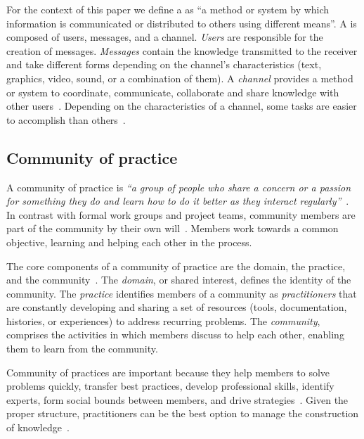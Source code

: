     For the context of this paper we define a \channel as {``a method or system by which information is communicated or distributed to others using different means''}.
    A \channel is composed of users, messages, and a channel.
    \textit{Users} are responsible for the creation of messages.
    \textit{Messages} contain the knowledge transmitted to the receiver and take different forms depending on the channel's characteristics (text, graphics, video, sound, or a combination of them).
    A \textit{channel} provides a method or system to coordinate, communicate, collaborate and share knowledge with other users~\cite{Storey2014}.
    Depending on the characteristics of a channel, some tasks are easier to accomplish than others~\cite{Storey2014,Vasilescu2014b}.

\subsection{Community of practice}

    A community of practice is \textit{``a group of people who share a concern or a passion for something they do and learn how to do it better as they interact regularly''}~\cite{Wenger2000}.
    In contrast with formal work groups and project teams, community members are part of the community by their own will~\cite{Wenger2000}.
    Members work towards a common objective, learning and helping each other in the process.

    The core components of a community of practice are the domain, the practice, and the community~\cite{Wenger2011}.
    The \textit{domain}, or shared interest, defines the identity of the community.
    The \textit{practice} identifies members of a community as \textit{practitioners} that are constantly developing and sharing a set of resources (tools, documentation, histories, or experiences) to address recurring problems. 
    The \textit{community}, comprises the activities in which members discuss to help each other, enabling them to learn from the community.

    Community of practices are important because they help members to solve problems quickly, transfer best practices, develop professional skills, identify experts, form social bounds between members, and drive strategies~\cite{Wenger2011, Storey2014}.
    Given the proper structure, practitioners can be the best option to manage the construction of knowledge~\cite{Wenger2011}.

